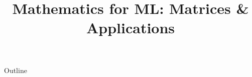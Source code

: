 \documentclass[xcolor=dvipsnames,compress,t,pdf,9pt]{beamer}
\title[\insertframenumber /\inserttotalframenumber]{Mathematics for ML: Matrices \& Applications}
\begin{document}
	\begin{frame}
	\titlepage
	\end{frame}

	\begin{frame}{Outline}
	    \tableofcontents
	\end{frame}

	
	
	
	
\end{document}
